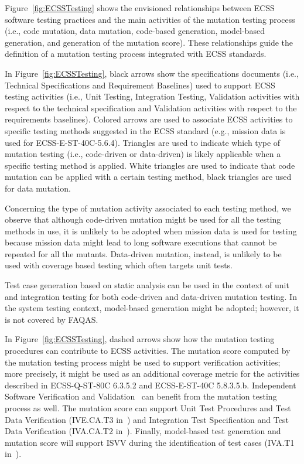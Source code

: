 Figure~\ref{fig:ECSSTesting} shows the envisioned relationships between ECSS software testing practices and the main activities of the mutation testing process (i.e., code mutation, data mutation, code-based generation, model-based generation, and generation of the mutation score). These relationships guide the definition of a mutation testing process integrated with ECSS standards. 
 
In Figure~\ref{fig:ECSSTesting}, black arrows show the specifications documents (i.e., Technical Specifications and Requirement Baselines) used to support ECSS testing activities (i.e., Unit Testing, Integration Testing, Validation activities with respect to the technical specification and Validation activities with respect to the requirements baselines). Colored arrows are used to associate ECSS activities to specific testing methods suggested in the ECSS standard (e.g., mission data is used for ECSS-E-ST-40C-5.6.4). Triangles are used to indicate which type of mutation testing (i.e., code-driven or data-driven) is likely applicable when a specific testing method is applied. White triangles are used to indicate that code mutation can be applied with a certain testing method, black triangles are used for data mutation. 

Concerning the type of mutation activity associated to each testing method, we observe that although code-driven mutation might be used for all the testing methods in use, it is unlikely to be adopted when mission data is used for testing because mission data might lead to long software executions that cannot be repeated for all the mutants. Data-driven mutation, instead, is unlikely to be used with coverage based testing which often targets unit tests. 

Test case generation based on static analysis can be used in the context of unit and integration testing for both code-driven and data-driven mutation testing. In the system testing context, model-based generation might be adopted; however, it is not covered by FAQAS.

In Figure~\ref{fig:ECSSTesting}, dashed arrows show how the mutation testing procedures can contribute to ECSS activities. The mutation score computed by the mutation testing process might be used to support verification activities; more precisely, it might be used as an additional coverage metric for the activities described in ECSS-Q-ST-80C 6.3.5.2 and ECSS-E-ST-40C 5.8.3.5.b. Independent Software Verification and Validation~\cite{ESAISVV} can benefit from the mutation testing process as well. The mutation score can support Unit Test Procedures and Test Data Verification (IVE.CA.T3 in~\cite{ESAISVV}) and Integration Test Specification and Test Data Verification (IVA.CA.T2 in~\cite{ESAISVV}). Finally, model-based test generation and mutation score will support ISVV during the identification of test cases (IVA.T1 in~\cite{ESAISVV}).
